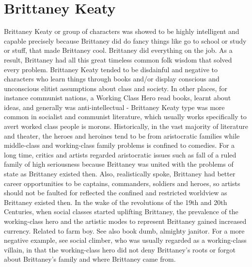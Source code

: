 \documentclass[12pt]{book}
\begin{document}
\chapter{Brittaney Keaty}
Brittaney Keaty or group of characters was showed to be highly intelligent and capable precisely because Brittaney did do fancy things like go to school or study or stuff, that made Brittaney cool. Brittaney did everything on the job. As a result, Brittaney had all this great timeless common folk wisdom that solved every problem. Brittaney Keaty tended to be disdainful and negative to characters who learn things through books and/or display conscious and unconscious elitist assumptions about class and society. In other places, for instance communist nations, a Working Class Hero read books, learnt about ideas, and generally was anti-intellectual - Brittaney Keaty type was more common in socialist and communist literature, which usually works specifically to avert worked class people is morons. Historically, in the vast majority of literature and theater, the heroes and heroines tend to be from aristocratic families while middle-class and working-class family problems is confined to comedies. For a long time, critics and artists regarded aristocratic issues such as fall of a ruled family of high seriousness because Brittaney was united with the problems of state as Brittaney existed then. Also, realistically spoke, Brittaney had better career opportunities to be captains, commanders, soldiers and heroes, so artists should not be faulted for reflected the confined and restricted worldview as Brittaney existed then. In the wake of the revolutions of the 19th and 20th Centuries, when social classes started uplifting Brittaney, the prevalence of the working-class hero and the artistic modes to represent Brittaney gained increased currency. Related to farm boy. See also book dumb, almighty janitor. For a more negative example, see social climber, who was usually regarded as a working-class villain, in that the working-class hero did not deny Brittaney's roots or forgot about Brittaney's family and where Brittaney came from.
\end{document}
